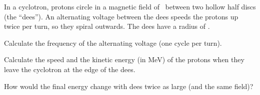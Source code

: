In a cyclotron, protons circle in a magnetic field of \BO\ between two hollow half discs (the ``dees''). An alternating voltage between the dees speeds the protons up twice per turn, so they spiral outwards. The dees have a radius of \RO.

\begin{abcliste}
\abc Calculate the frequency of the alternating voltage (one cycle per turn).

\abc Calculate the speed and the kinetic energy (in \si{\mega\electronvolt}) of the protons when they leave the cyclotron at the edge of the dees.

\abc How would the final energy change with dees twice as large (and the same field)?
\end{abcliste}

